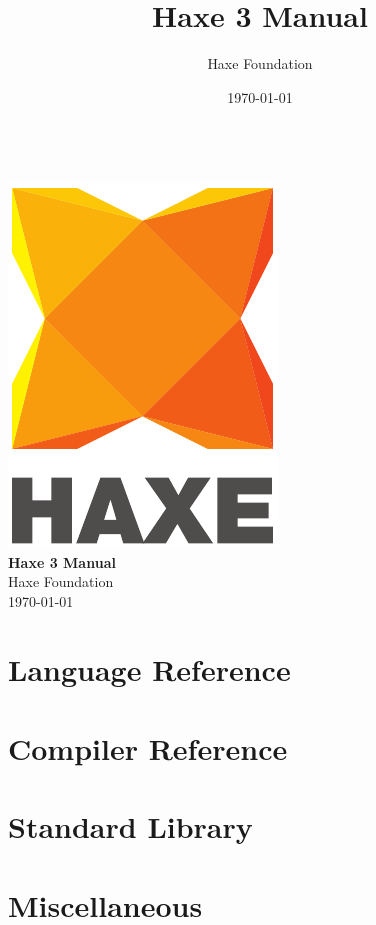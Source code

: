\documentclass{haxe}
\renewcommand{\maketitle}{
   \begin{titlepage}
     \setcounter{page}{-1}
			\begin{center}
				~\\[3cm]
				\includegraphics[scale=1.25]{assets/logo.pdf}~\\[1cm]
				{\huge \bfseries Haxe 3 Manual}\\[7cm]
				Haxe Foundation\\
				\today
			\end{center}
   \end{titlepage}
}
\begin{document}
\title{Haxe 3 Manual}
\author{Haxe Foundation}
\date{\today}
\maketitle


\clearpage
\todototoc
\listoftodos
\clearpage

\clearpage
\tableofcontents
\clearpage



\part{Language Reference}






\part{Compiler Reference}




\part{Standard Library}


\part{Miscellaneous}


\end{document}
